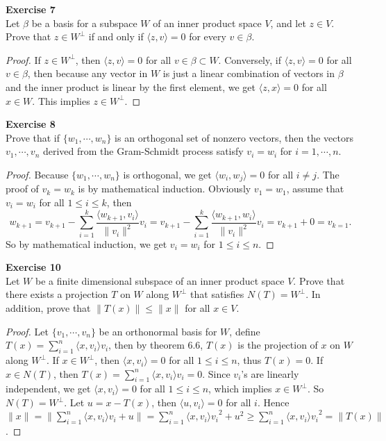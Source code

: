 \documentclass[12pt, a4paper]{article}
\theoremstyle{plain}
\newenvironment{exercise}[2][Exercise]
    { \begin{mdframed}[backgroundcolor=gray!20] \textbf{#1 #2} \\}
    {  \end{mdframed}}
\begin{document}
\begin{exercise}{7}
Let $\beta$ be a basis for a subspace $W$ of an inner product space $V$, and let $z\in V$. Prove that $z\in W^\perp$ if and only if $\langle{z,v}\rangle=0$ for every $v\in \beta$.
\end{exercise}
	\begin{proof}
	If $z\in W^\perp$, then $\langle{z,v}\rangle=0$ for all $v\in \beta\subset W$. Conversely, if $\langle{z,v}\rangle=0$ for all $v\in \beta$, then because any vector in $W$ is just a linear combination of vectors in $\beta$ and the inner product is linear by the first element, we get $\langle{z,x}\rangle =0$ for all $x\in W$. This implies $z\in W^\perp$.
	\end{proof}

\begin{exercise}{8}
Prove that if $\{w_1,\cdots,w_n\}$ is an orthogonal set of nonzero vectors, then the vectors $v_1,\cdots,v_n$ derived from the Gram-Schmidt process satisfy $v_i=w_i$ for $i=1,\cdots, n$.
\end{exercise}
	\begin{proof}
	Because $\{w_1,\cdots,w_n\}$ is orthogonal, we get $\langle{w_i,w_j}\rangle=0$ for all $i\neq j$. The proof of $v_k=w_k$ is by mathematical induction. Obviously $v_1=w_1$, assume that $v_i=w_i$ for all $1\leq i\leq k$, then 
	\[
	w_{k+1}=v_{k+1}-\sum_{i=1}^{k}{\frac{\langle{w_{k+1},v_i}\rangle}{\|v_i\|^2}v_i} = v_{k+1}-\sum_{i=1}^{k}{\frac{\langle{w_{k+1},w_i}\rangle}{\|v_i\|^2}v_i}=v_{k+1}+0=v_{k=1}.
	\]
	So by mathematical induction, we get $v_i=w_i$ for $1\leq i\leq n$.
	\end{proof}

\begin{exercise}{10}
Let $W$ be a finite dimensional subspace of an inner product space $V$. Prove that there exists a projection $T$ on $W$ along $W^\perp$ that satisfies $N(T)=W^\perp$. In addition, prove that $\|T(x)\|\leq \|x\|$ for all $x\in V$.
\end{exercise}
	\begin{proof}
	Let $\{v_1,\cdots,v_n\}$ be an orthonormal basis for $W$, define $T(x)=\sum_{i=1}^{n}{\langle{x,v_i}\rangle v_i}$, then by theorem 6.6, $T(x)$ is the projection of $x$ on $W$ along $W^\perp$. If $x\in W^\perp$, then $\langle{x,v_i}\rangle=0$ for all $1\leq i\leq n$, thus $T(x)=0$. If $x\in N(T)$, then $T(x)=\sum_{i=1}^{n}{\langle{x,v_i}\rangle v_i}=0$. Since $v_i$'s are linearly independent, we get $\langle{x,v_i}\rangle=0$ for all $1\leq i\leq n$, which implies $x\in W^\perp$. So $N(T)=W^\perp$. Let $u=x-T(x)$, then $\langle{u,v_i}\rangle =0$ for all $i$. Hence $\|x\|=\|\sum_{i=1}^{n}{\langle{x,v_i}\rangle v_i}+u\|=\sum_{i=1}^{n}{\langle{x,v_i}\rangle v_i}^2+u^2\geq \sum_{i=1}^{n}{\langle{x,v_i}\rangle v_i}^2=\|T(x)\|$.
	\end{proof}
\end{document}
